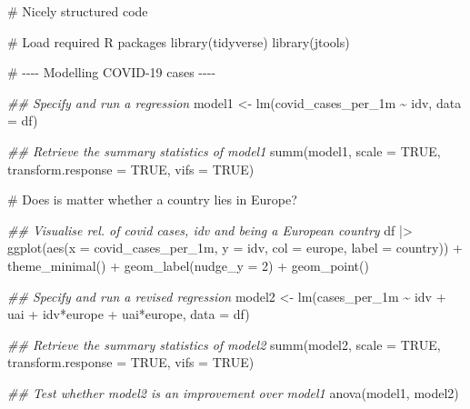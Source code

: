 \documentclass[
  letterpaper,
]{krantz}
\makeatletter
\newenvironment{Shaded}{\begin{snugshade}}{\end{snugshade}}
\newcommand{\AttributeTok}[1]{\textcolor[rgb]{0.40,0.45,0.13}{#1}}
\newcommand{\CommentTok}[1]{\textcolor[rgb]{0.37,0.37,0.37}{#1}}
\newcommand{\ConstantTok}[1]{\textcolor[rgb]{0.56,0.35,0.01}{#1}}
\newcommand{\DecValTok}[1]{\textcolor[rgb]{0.68,0.00,0.00}{#1}}
\newcommand{\DocumentationTok}[1]{\textcolor[rgb]{0.37,0.37,0.37}{\textit{#1}}}
\newcommand{\FunctionTok}[1]{\textcolor[rgb]{0.28,0.35,0.67}{#1}}
\newcommand{\NormalTok}[1]{\textcolor[rgb]{0.00,0.23,0.31}{#1}}
\newcommand{\OtherTok}[1]{\textcolor[rgb]{0.00,0.23,0.31}{#1}}
\newcommand{\SpecialCharTok}[1]{\textcolor[rgb]{0.37,0.37,0.37}{#1}}
\newenvironment{kframe}{%
\medskip{}
\setlength{\fboxsep}{.8em}
 \def\at@end@of@kframe{}%
 \ifinner\ifhmode%
  \def\at@end@of@kframe{\end{minipage}}%
  \begin{minipage}{\columnwidth}%
 \fi\fi%
 \def\FrameCommand##1{\hskip\@totalleftmargin \hskip-\fboxsep
 \colorbox{shadecolor}{##1}\hskip-\fboxsep
     \hskip-\linewidth \hskip-\@totalleftmargin \hskip\columnwidth}%
 \MakeFramed {\advance\hsize-\width
   \@totalleftmargin\z@ \linewidth\hsize
   \@setminipage}}%
 {\par\unskip\endMakeFramed%
 \at@end@of@kframe}
\renewenvironment{Shaded}{\begin{kframe}}{\end{kframe}}
\makeatother
\begin{document}
\begin{Shaded}
\begin{Highlighting}[]
\CommentTok{\# Nicely structured code}

\CommentTok{\# Load required R packages}
\FunctionTok{library}\NormalTok{(tidyverse)}
\FunctionTok{library}\NormalTok{(jtools)}

\CommentTok{\# {-}{-}{-}{-} Modelling COVID{-}19 cases {-}{-}{-}{-}}

\DocumentationTok{\#\# Specify and run a regression}
\NormalTok{model1 }\OtherTok{\textless{}{-}} \FunctionTok{lm}\NormalTok{(covid\_cases\_per\_1m }\SpecialCharTok{\textasciitilde{}}\NormalTok{ idv, }\AttributeTok{data =}\NormalTok{ df)}

\DocumentationTok{\#\# Retrieve the summary statistics of model1}
\FunctionTok{summ}\NormalTok{(model1,}
     \AttributeTok{scale =} \ConstantTok{TRUE}\NormalTok{,}
     \AttributeTok{transform.response =} \ConstantTok{TRUE}\NormalTok{,}
     \AttributeTok{vifs =} \ConstantTok{TRUE}\NormalTok{)}

\CommentTok{\# Does is matter whether a country lies in Europe?}

\DocumentationTok{\#\# Visualise rel. of covid cases, idv and being a European country}
\NormalTok{df }\SpecialCharTok{|\textgreater{}}
  \FunctionTok{ggplot}\NormalTok{(}\FunctionTok{aes}\NormalTok{(}\AttributeTok{x =}\NormalTok{ covid\_cases\_per\_1m,}
             \AttributeTok{y =}\NormalTok{ idv,}
             \AttributeTok{col =}\NormalTok{ europe,}
             \AttributeTok{label =}\NormalTok{ country)) }\SpecialCharTok{+}
  \FunctionTok{theme\_minimal}\NormalTok{() }\SpecialCharTok{+}
  \FunctionTok{geom\_label}\NormalTok{(}\AttributeTok{nudge\_y =} \DecValTok{2}\NormalTok{) }\SpecialCharTok{+}
  \FunctionTok{geom\_point}\NormalTok{()}

\DocumentationTok{\#\# Specify and run a revised regression}
\NormalTok{model2 }\OtherTok{\textless{}{-}} \FunctionTok{lm}\NormalTok{(cases\_per\_1m }\SpecialCharTok{\textasciitilde{}}\NormalTok{ idv }\SpecialCharTok{+}\NormalTok{ uai }\SpecialCharTok{+}\NormalTok{ idv}\SpecialCharTok{*}\NormalTok{europe }\SpecialCharTok{+}\NormalTok{ uai}\SpecialCharTok{*}\NormalTok{europe,}
                 \AttributeTok{data =}\NormalTok{ df)}

\DocumentationTok{\#\# Retrieve the summary statistics of model2}
\FunctionTok{summ}\NormalTok{(model2,}
     \AttributeTok{scale =} \ConstantTok{TRUE}\NormalTok{,}
     \AttributeTok{transform.response =} \ConstantTok{TRUE}\NormalTok{,}
     \AttributeTok{vifs =} \ConstantTok{TRUE}\NormalTok{)}

\DocumentationTok{\#\# Test whether model2 is an improvement over model1}
\FunctionTok{anova}\NormalTok{(model1, model2)}
\end{Highlighting}
\end{Shaded}
\end{document}
